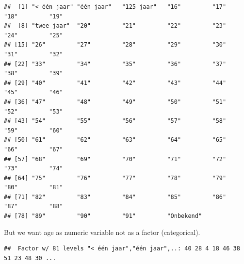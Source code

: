 \documentclass[
]{book}
\newenvironment{Shaded}{\begin{snugshade}}{\end{snugshade}}
\newcommand{\CommentTok}[1]{\textcolor[rgb]{0.56,0.35,0.01}{\textit{#1}}}
\newcommand{\DataTypeTok}[1]{\textcolor[rgb]{0.13,0.29,0.53}{#1}}
\newcommand{\KeywordTok}[1]{\textcolor[rgb]{0.13,0.29,0.53}{\textbf{#1}}}
\newcommand{\NormalTok}[1]{#1}
\newcommand{\OperatorTok}[1]{\textcolor[rgb]{0.81,0.36,0.00}{\textbf{#1}}}
\newcommand{\StringTok}[1]{\textcolor[rgb]{0.31,0.60,0.02}{#1}}
\begin{document}
\begin{Shaded}
\end{Shaded}

\begin{verbatim}
##  [1] "< één jaar" "één jaar"   "125 jaar"   "16"         "17"         "18"         "19"        
##  [8] "twee jaar"  "20"         "21"         "22"         "23"         "24"         "25"        
## [15] "26"         "27"         "28"         "29"         "30"         "31"         "32"        
## [22] "33"         "34"         "35"         "36"         "37"         "38"         "39"        
## [29] "40"         "41"         "42"         "43"         "44"         "45"         "46"        
## [36] "47"         "48"         "49"         "50"         "51"         "52"         "53"        
## [43] "54"         "55"         "56"         "57"         "58"         "59"         "60"        
## [50] "61"         "62"         "63"         "64"         "65"         "66"         "67"        
## [57] "68"         "69"         "70"         "71"         "72"         "73"         "74"        
## [64] "75"         "76"         "77"         "78"         "79"         "80"         "81"        
## [71] "82"         "83"         "84"         "85"         "86"         "87"         "88"        
## [78] "89"         "90"         "91"         "Onbekend"
\end{verbatim}

But we want age as numeric variable not as a factor (categorical).

\begin{Shaded}
\end{Shaded}

\begin{verbatim}
##  Factor w/ 81 levels "< één jaar","één jaar",..: 40 28 4 18 46 38 51 23 48 30 ...
\end{verbatim}

\begin{Shaded}
\end{Shaded}
\end{document}

